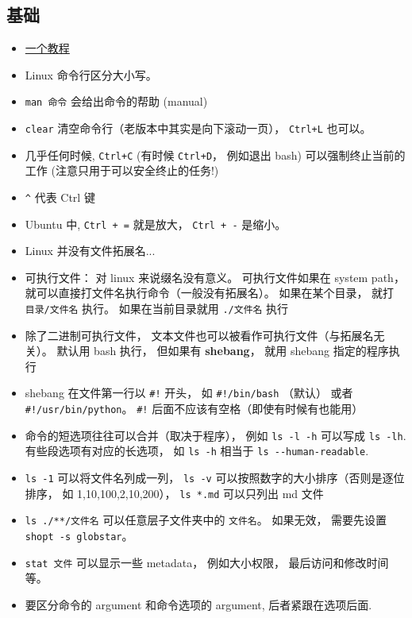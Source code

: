 

\subsection{基础}
\begin{itemize}
\item \href{http://faculty.salina.k-state.edu/tim/unix_sg/index.html}{一个教程}
\item Linux 命令行区分大小写。
\item \verb`man 命令`  会给出命令的帮助 (manual)
\item \verb`clear` 清空命令行（老版本中其实是向下滚动一页）， \verb|Ctrl+L| 也可以。
\item 几乎任何时候, \verb|Ctrl+C| (有时候 \verb|Ctrl+D|， 例如退出 bash) 可以强制终止当前的工作 (注意只用于可以安全终止的任务!)
\item \verb`^` 代表 Ctrl 键
\item Ubuntu 中, \verb|Ctrl + =| 就是放大， \verb|Ctrl + -| 是缩小。
\item Linux 并没有文件拓展名...
\item 可执行文件： 对 linux 来说缀名没有意义。 可执行文件如果在 system path， 就可以直接打文件名执行命令（一般没有拓展名）。 如果在某个目录， 就打 \verb`目录/文件名` 执行。 如果在当前目录就用 \verb`./文件名` 执行
\item 除了二进制可执行文件， 文本文件也可以被看作可执行文件（与拓展名无关）。 默认用 bash 执行， 但如果有 \textbf{shebang}， 就用 shebang 指定的程序执行
\item shebang 在文件第一行以 \verb`#!` 开头， 如 \verb`#!/bin/bash` （默认） 或者 \verb`#!/usr/bin/python`。 \verb|#!| 后面不应该有空格（即使有时候有也能用）
\item 命令的短选项往往可以合并（取决于程序）， 例如 \verb`ls -l -h` 可以写成 \verb`ls -lh`. 有些段选项有对应的长选项， 如 \verb`ls -h` 相当于 \verb`ls --human-readable`.
\item \verb`ls -1` 可以将文件名列成一列， \verb`ls -v` 可以按照数字的大小排序（否则是逐位排序， 如 1,10,100,2,10,200）， \verb`ls *.md` 可以只列出 md 文件
\item \verb|ls ./**/文件名| 可以任意层子文件夹中的 \verb|文件名|。 如果无效， 需要先设置 \verb|shopt -s globstar|。
\item \verb|stat 文件| 可以显示一些 metadata， 例如大小权限， 最后访问和修改时间等。
\item 要区分命令的 argument 和命令选项的 argument, 后者紧跟在选项后面.

\end{itemize}
